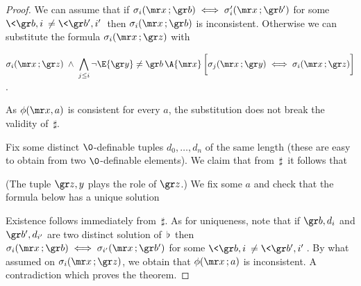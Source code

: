 \begin{proof}
We can assume that if  $\sigma_i({\mr x}\,;{\gr b})\iff\sigma_i'({\mr x}\,;{\gr b'})$ for some $\<{\gr b},i\>\neq\<{\gr b'},i'\>$ then $\sigma_i({\mr x}\,;{\gr b})$ is inconsistent.
Otherwise we can substitute the formula $\sigma_i({\mr x}\,;{\gr z})$ with  


\hfil$\displaystyle\sigma_i({\mr x}\,;{\gr z}) \;\wedge\; \bigwedge_{j\le i}\neg\E{\gr y}\neq{\gr b}\,\A {\mr x}\,\bigg[\sigma_j({\mr x}\,;{\gr y})\iff\sigma_i({\mr x}\,;{\gr z})\bigg]$.


As $\phi({\mr x},a)$ is consistent for every $a$, the substitution does not break the validity of $\,\sharp$.

Fix some distinct $\0$-definable tuples $d_0,\dots, d_n$ of the same length (these are easy to obtain from two $\0$-definable elements).
We claim that from $\,\sharp\,$ it follows that


(The tuple ${\gr z},y$ plays the role of ${\gr z}$.)  We fix some $a$ and check that the formula below has a unique solution


Existence follows immediately from $\,\sharp$.
As for uniqueness, note that if ${\gr b},d_i$ and ${\gr b'},d_{i'}$ are two distinct solution of $\,\flat\,$ then $\sigma_i({\mr x}\,;{\gr b})\iff\sigma_{i'}({\mr x}\,;{\gr b'})$ for some $\<{\gr b},i\>\neq\<{\gr b'},i'\>$.
By what assumed on $\sigma_i({\mr x}\,;{\gr z})$, we obtain that $\phi({\mr x}\,;a)$ is inconsistent.
A contradiction which proves the theorem.
\end{proof}